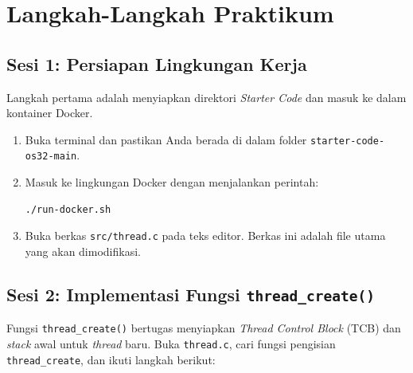 \newpage
\section{Langkah-Langkah Praktikum}

\subsection{Sesi 1: Persiapan Lingkungan Kerja}
\label{sec:m08-sesi-1}
Langkah pertama adalah menyiapkan direktori \textit{Starter Code} dan masuk ke dalam kontainer Docker.

\begin{enumerate}
	\item Buka terminal dan pastikan Anda berada di dalam folder \texttt{starter-code-os32-main}.
	\item Masuk ke lingkungan Docker dengan menjalankan perintah:
	      \begin{lstlisting}[language=bash, caption={Masuk ke lingkungan kontainer}]
./run-docker.sh
    \end{lstlisting}
	\item Buka berkas \texttt{src/thread.c} pada teks editor. Berkas ini adalah file utama yang akan dimodifikasi.
\end{enumerate}

\subsection{Sesi 2: Implementasi Fungsi \texttt{thread\_create()}}
\label{sec:m08-sesi-2}
Fungsi \texttt{thread\_create()} bertugas menyiapkan \textit{Thread Control Block} (TCB) dan \textit{stack} awal untuk \textit{thread} baru. Buka \texttt{thread.c}, cari fungsi pengisian \texttt{thread\_create}, dan ikuti langkah berikut:

